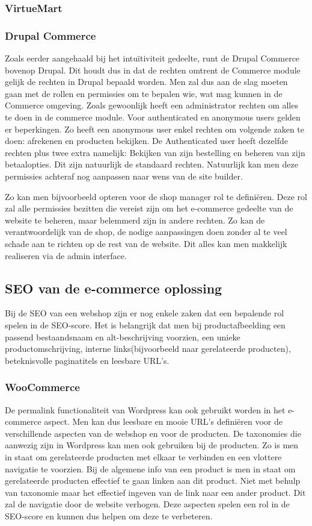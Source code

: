 \subsubsection{VirtueMart}

\subsubsection{Drupal Commerce}
Zoals eerder aangehaald bij het intuïtiviteit gedeelte, runt de Drupal Commerce bovenop Drupal. Dit houdt dus in dat de rechten omtrent de Commerce module gelijk de rechten in Drupal bepaald worden. Men zal dus aan de slag moeten gaan met de rollen en permissies om te bepalen wie, wat mag kunnen in de Commerce omgeving. Zoals gewoonlijk heeft een administrator rechten om alles te doen in de commerce module. Voor authenticated en anonymous users gelden er beperkingen. Zo heeft een anonymous user enkel rechten om volgende zaken te doen: afrekenen en producten bekijken. De Authenticated user heeft dezelfde rechten plus twee extra namelijk: Bekijken van zijn bestelling en beheren van zijn betaalopties. Dit zijn natuurlijk de standaard rechten. Natuurlijk kan men deze permissies achteraf nog aanpassen naar wens van de site builder. 

Zo kan men bijvoorbeeld opteren voor de shop manager rol te definiëren. Deze rol zal alle permissies bezitten die vereist zijn om het e-commerce gedeelte van de website te beheren, maar belemmerd zijn in andere rechten. Zo kan de verantwoordelijk van de shop, de nodige aanpassingen doen zonder al te veel schade aan te richten op de rest van de website. Dit alles kan men makkelijk realiseren via de admin interface.
\subsection{SEO van de e-commerce oplossing}
Bij de SEO van een webshop zijn er nog enkele zaken dat een bepalende rol spelen in de SEO-score. Het is belangrijk dat men bij productafbeelding een passend bestaandsnaam en alt-beschrijving voorzien, een unieke productomschrijving, interne links(bijvoorbeeld naar gerelateerde producten), beteknisvolle paginatitels en leesbare URL's.
\subsubsection{WooCommerce}
De permalink functionaliteit van Wordpress kan ook gebruikt worden in het e-commerce aspect. Men kan dus leesbare en mooie URL's definiëren voor de verschillende aspecten van de webshop en voor de producten. De taxonomies die aanwezig zijn in Wordpress kan men ook gebruiken bij de producten. Zo is men in staat om gerelateerde producten met elkaar te verbinden en een vlottere navigatie te voorzien. Bij de algemene info van een product is men in staat om gerelateerde producten effectief te gaan linken aan dit product. Niet met behulp van taxonomie maar het effectief ingeven van de link naar een ander product. Dit zal de navigatie door de website verhogen. Deze aspecten spelen een rol in de SEO-score en kunnen dus helpen om deze te verbeteren.
